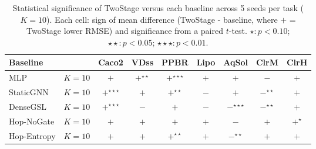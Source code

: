 \begin{table}[t]
\centering
\small
\caption{Statistical significance of TwoStage versus each baseline across 5 seeds per task ($K=10$). Each cell: sign of mean difference (TwoStage - baseline, where $+$ = TwoStage lower RMSE) and significance from a paired $t$-test. $\star\!:\! p\!<\!0.10$; $\star\star\!:\! p\!<\!0.05$; $\star\star\star\!:\! p\!<\!0.01$.}
\label{tab:significance}
\begin{tabular}{llccccccc}
\toprule
Baseline & & Caco2 & VDss & PPBR & Lipo & AqSol & ClrM & ClrH \\
\midrule
MLP & $K{=}10$ & $+$ & $+^{\star\star}$ & $+^{\star\star\star}$ & $+$ & $+$ & $-$ & $+$ \\
StaticGNN & $K{=}10$ & $+^{\star\star\star}$ & $+$ & $+^{\star\star}$ & $-$ & $+$ & $-^{\star\star}$ & $+$ \\
DenseGSL & $K{=}10$ & $+^{\star\star\star}$ & $-$ & $+$ & $-$ & $-^{\star\star\star}$ & $-^{\star\star}$ & $+$ \\
Hop-NoGate & $K{=}10$ & $+$ & $+$ & $+$ & $+$ & $-$ & $+$ & $+^{\star}$ \\
Hop-Entropy & $K{=}10$ & $+$ & $+$ & $+^{\star\star}$ & $+$ & $-^{\star\star}$ & $+$ & $+$ \\
\bottomrule
\end{tabular}
\end{table}